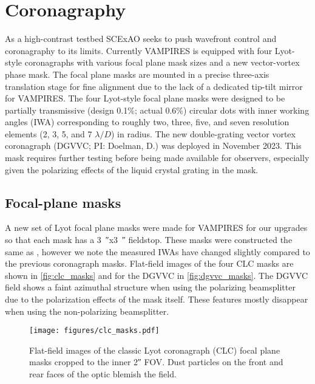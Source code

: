 \section{Coronagraphy}\label{sec:coronagraphy}

As a high-contrast testbed SCExAO seeks to push wavefront control and coronagraphy to its limits. Currently VAMPIRES is equipped with four Lyot-style coronagraphs with various focal plane mask sizes and a new vector-vortex phase mask. The focal plane masks are mounted in a precise three-axis translation stage for fine alignment due to the lack of a dedicated tip-tilt mirror for VAMPIRES. The four Lyot-style focal plane masks were designed to be partially transmissive (design 0.1\%; actual 0.6\%) circular dots with inner working angles (IWA) corresponding to roughly two, three, five, and seven resolution elements (2, 3, 5, and 7 $\lambda/D$) in radius. The new double-grating vector vortex coronagraph (DGVVC; PI: Doelman, D.) was deployed in November 2023. This mask requires further testing before being made available for observers, especially given the polarizing effects of the liquid crystal grating in the mask.

\subsection{Focal-plane masks}

A new set of Lyot focal plane masks were made for VAMPIRES for our upgrades so that each mask has a \SI{3}{\arcsecond}x\SI{3}{\arcsecond} fieldstop. These masks were constructed the same as \citet{lucas_visible-light_2022}, however we note the measured IWAs have changed slightly compared to the previous coronagraph masks. Flat-field images of the four CLC masks are shown in \autoref{fig:clc_masks} and for the DGVVC in \autoref{fig:dgvvc_masks}. The DGVVC field shows a faint azimuthal structure when using the polarizing beamsplitter due to the polarization effects of the mask itself. These features mostly disappear when using the non-polarizing beamsplitter.

\begin{figure}
    \centering
    \texttt{[image: figures/clc\_masks.pdf]}
    \caption{Flat-field images of the classic Lyot coronagraph (CLC) focal plane masks cropped to the inner \ang{;;2} FOV. Dust particles on the front and rear faces of the optic blemish the field.\label{fig:clc_masks}}
\end{figure}

